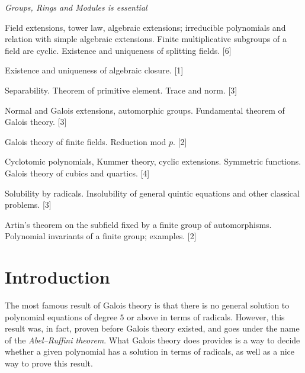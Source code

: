 \documentclass[a4paper]{article}
\begin{document}
\maketitle
{\small
\noindent\emph{Groups, Rings and Modules is essential}
\vspace{10pt}

\noindent Field extensions, tower law, algebraic extensions; irreducible polynomials and relation with simple algebraic extensions. Finite multiplicative subgroups of a field are cyclic. Existence and uniqueness of splitting fields.\hspace*{\fill} [6]

\vspace{5pt}
\noindent Existence and uniqueness of algebraic closure.\hspace*{\fill} [1]

\vspace{5pt}
\noindent Separability. Theorem of primitive element. Trace and norm.\hspace*{\fill} [3]

\vspace{5pt}
\noindent Normal and Galois extensions, automorphic groups. Fundamental theorem of Galois theory.\hspace*{\fill} [3]

\vspace{5pt}
\noindent Galois theory of finite fields. Reduction mod $p$.\hspace*{\fill} [2]

\vspace{5pt}
\noindent Cyclotomic polynomials, Kummer theory, cyclic extensions. Symmetric functions. Galois theory of cubics and quartics.\hspace*{\fill} [4]

\vspace{5pt}
\noindent Solubility by radicals. Insolubility of general quintic equations and other classical problems.\hspace*{\fill} [3]

\vspace{5pt}
\noindent Artin's theorem on the subfield fixed by a finite group of automorphisms. Polynomial invariants of a finite group; examples.\hspace*{\fill} [2]}

\tableofcontents

\setcounter{section}{-1}
\section{Introduction}
The most famous result of Galois theory is that there is no general solution to polynomial equations of degree $5$ or above in terms of radicals. However, this result was, in fact, proven before Galois theory existed, and goes under the name of the \emph{Abel--Ruffini theorem}. What Galois theory does provides is a way to decide whether a given polynomial has a solution in terms of radicals, as well as a nice way to prove this result.
\end{document}
